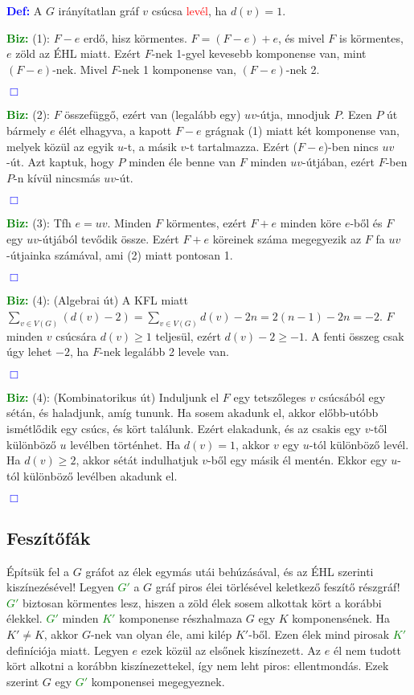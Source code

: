 \documentclass[12pt]{article}
\begin{document}
			\textcolor{blue}{\textbf{Def:}} A $G$ irányítatlan gráf $v$ csúcsa \textcolor{red}{levél}, ha $d(v)=1$.

			\textcolor{green}{\textbf{Biz:}} (1): $F-e$ erdő, hisz körmentes. $F=(F-e)+e$, és mivel $F$ is körmentes, $e$ zöld az ÉHL miatt. Ezért $F$-nek 1-gyel kevesebb komponense van, mint $(F-e)$-nek. Mivel $F$-nek 1 komponense van, $(F-e)$-nek 2. \raggedright \textcolor{blue}{$\Box$} 
		
			\textcolor{green}{\textbf{Biz:}} (2): $F$ összefüggő, ezért van (legalább egy) $uv$-útja, mnodjuk $P$. Ezen $P$ út bármely $e$ élét elhagyva, a kapott $F-e$ grágnak (1) miatt két komponense van, melyek közül az egyik $u$-t, a másik $v$-t tartalmazza. Ezért ($F-e$)-ben nincs $uv$-út. Azt kaptuk, hogy $P$ minden éle benne van $F$ minden $uv$-útjában, ezért $F$-ben $P$-n kívül nincsmás $uv$-út. \raggedright \textcolor{blue}{$\Box$} 
		
			\textcolor{green}{\textbf{Biz:}} (3): Tfh $e=uv$. Minden $F$ körmentes, ezért $F+e$ minden köre $e$-ből és $F$ egy $uv$-útjából tevődik össze. Ezért $F+e$ köreinek száma megegyezik az $F$ fa $uv$-útjainka számával, ami (2) miatt pontosan 1. \raggedright \textcolor{blue}{$\Box$} 
		
			\textcolor{green}{\textbf{Biz:}} (4): (Algebrai út) A KFL miatt $\sum_{v\in V(G)}(d(v)-2)=\sum_{v\in V(G)}d(v)-2n=2(n-1)-2n=-2$. $F$ minden $v$ csúcsára $d(v) \geq 1$ teljesül, ezért $d(v) - 2 \geq -1$. A fenti összeg csak úgy lehet $-2$, ha $F$-nek legalább 2 levele van. \raggedright \textcolor{blue}{$\Box$} 
		
			\textcolor{green}{\textbf{Biz:}} (4): (Kombinatorikus út) Induljunk el $F$ egy tetszőleges $v$ csúcsából egy sétán, és haladjunk, amíg tununk. Ha sosem akadunk el, akkor előbb-utóbb ismétlődik egy csúcs, és kört találunk. Ezért elakadunk, és az csakis egy $v$-től különböző $u$ levélben történhet. Ha $d(v)=1$, akkor $v$ egy $u$-tól különböző levél. Ha $d(v) \geq 2$, akkor sétát indulhatjuk $v$-ből egy másik él mentén. Ekkor egy $u$-tól különböző levélben akadunk el. \raggedright \textcolor{blue}{$\Box$} 

		\subsection{Feszítőfák}
		
			Építsük fel a $G$ gráfot az élek egymás utái behúzásával, és az ÉHL szerinti kiszínezésével! Legyen \textcolor{green}{$G'$} a $G$ gráf piros élei törlésével keletkező feszítő részgráf! \textcolor{green}{$G'$} biztosan körmentes lesz, hiszen a zöld élek sosem alkottak kört a korábbi élekkel. \textcolor{green}{$G'$} minden \textcolor{green}{$K'$} komponense részhalmaza $G$ egy $K$ komponensének. Ha $K' \neq K$, akkor $G$-nek van olyan éle, ami kilép $K'$-ből. Ezen élek mind pirosak \textcolor{green}{$K'$} definíciója miatt. Legyen $e$ ezek közül az elsőnek kiszínezett. Az $e$ él nem tudott kört alkotni a korábbn kiszínezettekel, így nem leht piros: ellentmondás. Ezek szerint $G$ egy \textcolor{green}{$G'$} komponensei megegyeznek.
\end{document}

